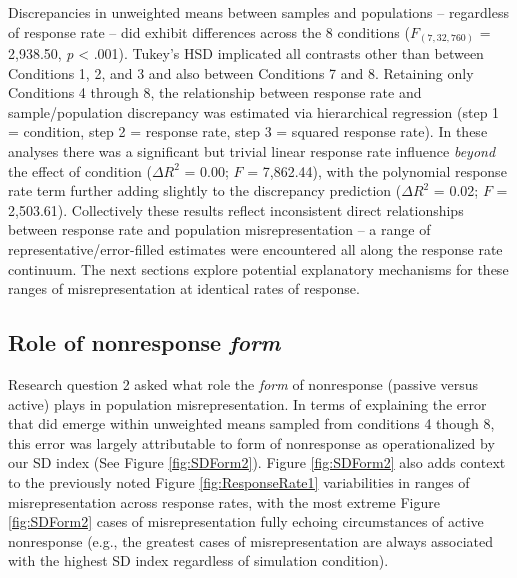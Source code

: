 \documentclass[
  man,mask]{apa7}
\begin{document}
Discrepancies in unweighted means between samples and populations -- regardless of response rate -- did exhibit differences across the 8 conditions (\(F_{(7,32,760)}\) = 2,938.50, \emph{p} \textless{} .001). Tukey's HSD implicated all contrasts other than between Conditions 1, 2, and 3 and also between Conditions 7 and 8. Retaining only Conditions 4 through 8, the relationship between response rate and sample/population discrepancy was estimated via hierarchical regression (step 1 = condition, step 2 = response rate, step 3 = squared response rate). In these analyses there was a significant but trivial linear response rate influence \emph{beyond} the effect of condition (\(\Delta{R^2}\) = 0.00; \(F\) = 7,862.44), with the polynomial response rate term further adding slightly to the discrepancy prediction (\(\Delta{R^2}\) = 0.02; \(F\) = 2,503.61). Collectively these results reflect inconsistent direct relationships between response rate and population misrepresentation -- a range of representative/error-filled estimates were encountered all along the response rate continuum. The next sections explore potential explanatory mechanisms for these ranges of misrepresentation at identical rates of response.

\subsection{\texorpdfstring{Role of nonresponse \emph{form}}{Role of nonresponse form}}\label{role-of-nonresponse-form}

Research question 2 asked what role the \emph{form} of nonresponse (passive versus active) plays in population misrepresentation. In terms of explaining the error that did emerge within unweighted means sampled from conditions 4 though 8, this error was largely attributable to form of nonresponse as operationalized by our SD index (See Figure \ref{fig:SDForm2}). Figure \ref{fig:SDForm2} also adds context to the previously noted Figure \ref{fig:ResponseRate1} variabilities in ranges of misrepresentation across response rates, with the most extreme Figure \ref{fig:SDForm2} cases of misrepresentation fully echoing circumstances of active nonresponse (e.g., the greatest cases of misrepresentation are always associated with the highest SD index regardless of simulation condition).
\end{document}
